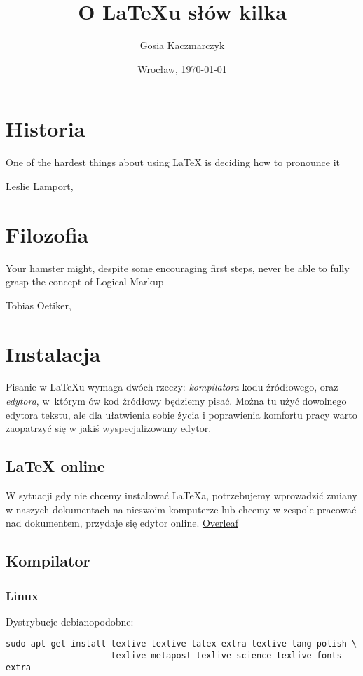 \documentclass[11pt,a4paper]{article}
\author{Gosia Kaczmarczyk}
\title{O \LaTeX u słów kilka}
\date{Wrocław, \today}
\begin{document}
\maketitle

\section{Historia}

\epigraph{One of the hardest things about using \LaTeX{} is deciding how to pronounce it}{Leslie Lamport, \cite{lamport}}

\section{Filozofia}

\epigraph{Your hamster might, despite some encouraging first steps, never be
able to fully grasp the concept of Logical Markup}{Tobias Oetiker, \cite{lshort}}

\section{Instalacja}

Pisanie w \LaTeX u wymaga dwóch rzeczy: \emph{kompilatora} kodu źródłowego, oraz \emph{edytora}, w~którym ów kod źródłowy będziemy pisać. Można tu użyć dowolnego edytora tekstu, ale dla ułatwienia sobie życia i poprawienia komfortu pracy warto zaopatrzyć się w jakiś wyspecjalizowany edytor. 

\subsection{\LaTeX{} online}

W sytuacji gdy nie chcemy instalować \LaTeX a, potrzebujemy wprowadzić zmiany w naszych dokumentach na nieswoim komputerze lub chcemy w zespole pracować nad dokumentem, przydaje się edytor online. \href{https://www.overleaf.com/}{Overleaf}

\subsection{Kompilator}
\subsubsection{Linux} \label{sec:kompilator-linux}

Dystrybucje debianopodobne:
\begin{verbatim}
sudo apt-get install texlive texlive-latex-extra texlive-lang-polish \
                     texlive-metapost texlive-science texlive-fonts-extra
\end{verbatim}
\end{document}
